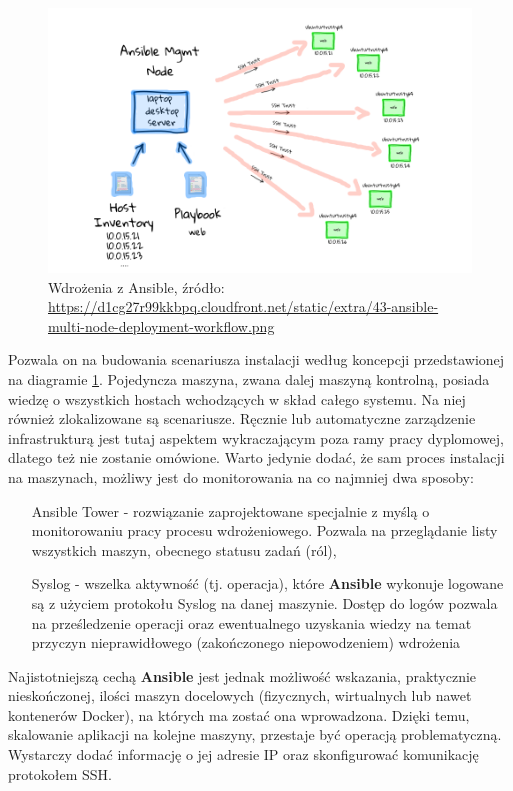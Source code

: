     \begin{figure}[h]
        \centering
        \includegraphics[width=1.0\textwidth]{images/43-ansible-multi-node-deployment-workflow}
        \caption[Wdrożenia z Ansible]{
            Wdrożenia z Ansible, 
            źródło: \url{https://d1cg27r99kkbpq.cloudfront.net/static/extra/43-ansible-multi-node-deployment-workflow.png}
        }
        \label{chapter:application:architecture:installation:ansible_diagram}
    \end{figure}
     
    Pozwala on na budowania scenariusza instalacji według koncepcji przedstawionej na diagramie 
    \ref{chapter:application:architecture:installation:ansible_diagram}. Pojedyncza maszyna, zwana dalej
    maszyną kontrolną, posiada wiedzę o wszystkich hostach wchodzących w skład całego systemu. Na niej
    również zlokalizowane są scenariusze. Ręcznie lub automatyczne zarządzenie infrastrukturą jest
    tutaj aspektem wykraczającym poza ramy pracy dyplomowej, dlatego też nie zostanie omówione. 
    Warto jedynie dodać, że sam proces instalacji na maszynach, możliwy jest do monitorowania na co najmniej
    dwa sposoby:
    
    \begin{itemize}
        \item[Ansible Tower] - rozwiązanie zaprojektowane specjalnie z myślą o monitorowaniu pracy
        procesu wdrożeniowego. Pozwala na przeglądanie listy wszystkich maszyn, obecnego statusu
        zadań (ról),
        \item[Syslog] - wszelka aktywność (tj. operacja), które \textbf{Ansible} wykonuje logowane są
        z użyciem protokołu Syslog na danej maszynie. Dostęp do logów pozwala na prześledzenie operacji oraz
        ewentualnego uzyskania wiedzy na temat przyczyn nieprawidłowego (zakończonego niepowodzeniem) wdrożenia
    \end{itemize}
    
    Najistotniejszą cechą \textbf{Ansible} jest jednak możliwość wskazania, praktycznie nieskończonej,
    ilości maszyn docelowych (fizycznych, wirtualnych lub nawet kontenerów Docker), na których ma zostać ona wprowadzona. 
    Dzięki temu, skalowanie aplikacji na kolejne maszyny, przestaje być operacją problematyczną. Wystarczy dodać 
    informację o jej adresie IP oraz skonfigurować komunikację protokołem SSH.
